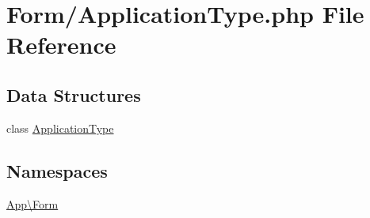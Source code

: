 \hypertarget{_application_type_8php}{}\section{Form/\+Application\+Type.php File Reference}
\label{_application_type_8php}
\subsection*{Data Structures}
\begin{DoxyCompactItemize}
\item 
class \mbox{\hyperlink{class_app_1_1_form_1_1_application_type}{Application\+Type}}
\end{DoxyCompactItemize}
\subsection*{Namespaces}
\begin{DoxyCompactItemize}
\item 
 \mbox{\hyperlink{namespace_app_1_1_form}{App\textbackslash{}\+Form}}
\end{DoxyCompactItemize}
